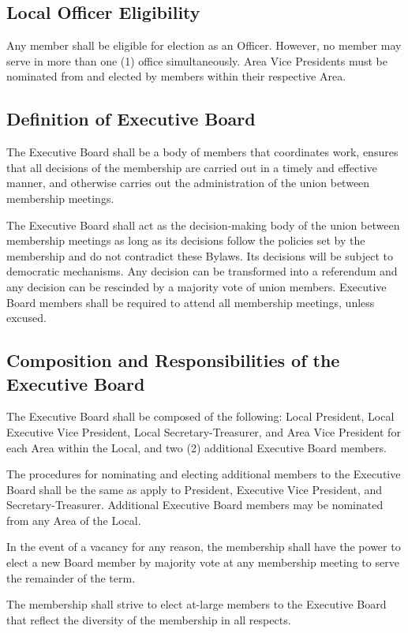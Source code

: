 \documentclass[11pt]{article}
\newcommand{\articlesection}[1]{\vspace{.25cm}\subsection{#1}}
\begin{document}
\articlesection{Local Officer Eligibility}
Any member shall be eligible for election as an Officer. However, no member may serve in more than one (1) office simultaneously. Area Vice Presidents must be nominated from and elected by members within their respective Area.

\articlesection{Definition of Executive Board}
\begin{paralist}
  \item The Executive Board shall be a body of members that coordinates work, ensures that all decisions of the membership are carried out in a timely and effective manner, and otherwise carries out the administration of the union between membership meetings.
  \item The Executive Board shall act as the decision-making body of the union between membership meetings as long as its decisions follow the policies set by the membership and do not contradict these Bylaws. Its decisions will be subject to democratic mechanisms. Any decision can be transformed into a referendum and any decision can be rescinded by a majority vote of union members. Executive Board members shall be required to attend all membership meetings, unless excused.
\end{paralist}

\articlesection{Composition and Responsibilities of the Executive Board}
\begin{paralist}
  \item The Executive Board shall be composed of the following: Local President, Local Executive Vice President, Local Secretary-Treasurer, and Area Vice President for each Area within the Local, and two (2) additional Executive Board members.
  \item The procedures for nominating and electing additional members to the Executive Board shall be the same as apply to President, Executive Vice President, and Secretary-Treasurer. Additional Executive Board members may be nominated from any Area of the Local.
  \item In the event of a vacancy for any reason, the membership shall have the power to elect a new Board member by majority vote at any membership meeting to serve the remainder of the term.
  \item The membership shall strive to elect at-large members to the Executive Board that reflect the diversity of the membership in all respects.
\end{paralist}
\end{document}
